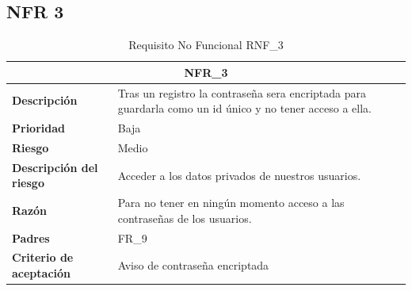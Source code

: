 \documentclass{scrreprt}
\begin{document}
\subsection{NFR 3}
    \begin{table}[H]
        \label{tab:my-table}
        \begin{tabular}{|p{5cm}|p{11cm}|}
        \hline
        \multicolumn{2}{|c|}{\textbf{NFR_3}} \\
        \hline
        \textbf{Descripción  }                      &  Tras un registro la contraseña sera encriptada para guardarla como un id único y no tener acceso a ella.                                                                      \\ \hline
        \textbf{Prioridad}                          & Baja                                                                                              \\ \hline
        \textbf{Riesgo}                          & Medio                                                                                                \\ \hline
        \textbf{Descripción del riesgo}                    &  Acceder a los datos privados de nuestros usuarios.                          \\ \hline
        \textbf{Razón}                   & Para no tener en ningún momento acceso a las contraseñas de los usuarios.  \\ \hline
        \textbf{Padres}                               &  FR_9\\  \hline
         \textbf{Criterio de aceptación}                    & Aviso de contraseña encriptada  \\ \hline
        \end{tabular}%
        
        \caption{Requisito No Funcional RNF_3}
\end{table}
\end{document}
